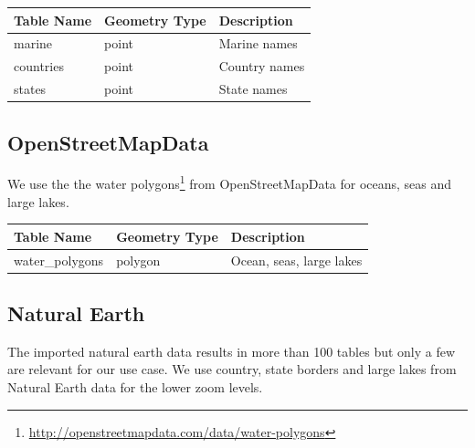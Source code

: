 \begin{flushleft}
    \begin{tabular}{lll}
    \hline
    Table Name   & Geometry Type & Description \\
    \hline                                          
    marine       & point    & Marine names \\
    countries    & point    & Country names \\
    states       & point    & State names \\

    \end{tabular}
\end{flushleft}

\subsection{OpenStreetMapData}

We use the the water polygons\footnote{\url{http://openstreetmapdata.com/data/water-polygons}} 
from OpenStreetMapData for oceans, seas and large lakes.

\begin{flushleft}
    \begin{tabular}{lll}
    \hline
    Table Name            & Geometry Type & Description \\
    \hline
    water\_polygons        & polygon       & Ocean, seas, large lakes           \\
    \end{tabular}
\end{flushleft}


\subsection{Natural Earth}


The imported natural earth data results in more than 100 tables but only a few
are relevant for our use case.
We use country, state borders and large lakes from Natural Earth data for the lower zoom
levels.


